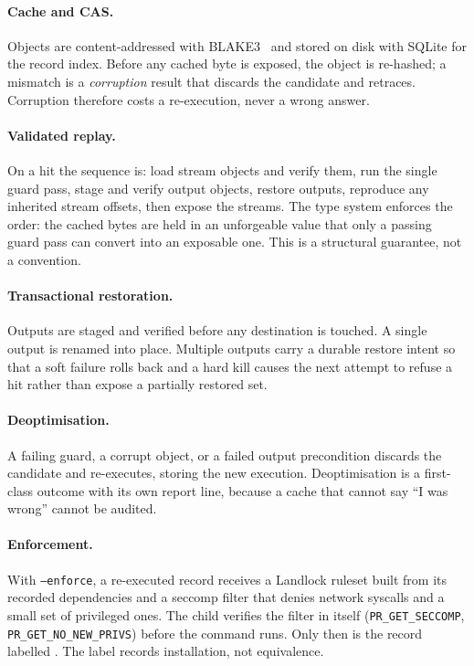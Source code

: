 \paragraph{Cache and CAS.}
Objects are content-addressed with BLAKE3~\cite{blake3} and stored on disk with SQLite for the
record index. Before any cached byte is exposed, the object is re-hashed; a mismatch is a
\emph{corruption} result that discards the candidate and retraces. Corruption therefore costs a
re-execution, never a wrong answer.

\paragraph{Validated replay.}
On a hit the sequence is: load stream objects and verify them, run the single guard pass, stage and
verify output objects, restore outputs, reproduce any inherited stream offsets, then expose the
streams. The type system enforces the order: the cached bytes are held in an unforgeable value
that only a passing guard pass can convert into an exposable one. This is a structural guarantee,
not a convention.

\paragraph{Transactional restoration.}
Outputs are staged and verified before any destination is touched. A single output is renamed into
place. Multiple outputs carry a durable restore intent so that a soft failure rolls back and a hard
kill causes the next attempt to refuse a hit rather than expose a partially restored set.

\paragraph{Deoptimisation.}
A failing guard, a corrupt object, or a failed output precondition discards the candidate and
re-executes, storing the new execution. Deoptimisation is a first-class outcome with its own
report line, because a cache that cannot say ``I was wrong'' cannot be audited.

\paragraph{Enforcement.}
With \texttt{--enforce}, a re-executed record receives a Landlock ruleset built from its recorded
dependencies and a seccomp filter that denies network syscalls and a small set of privileged ones.
The child verifies the filter in itself (\texttt{PR\_GET\_SECCOMP}, \texttt{PR\_GET\_NO\_NEW\_PRIVS})
before the command runs. Only then is the record labelled \proven{}. The label records
installation, not equivalence.
